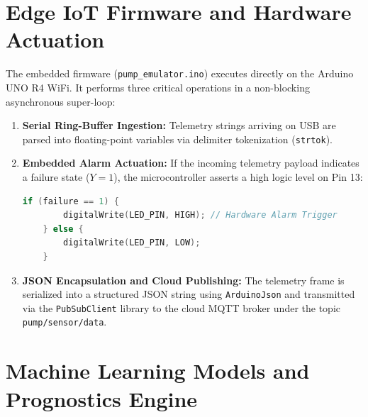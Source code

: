 \documentclass[11pt,a4paper]{article}
\begin{document}
\section{Edge IoT Firmware and Hardware Actuation}

The embedded firmware (\texttt{pump\_emulator.ino}) executes directly on the Arduino UNO R4 WiFi. It performs three critical operations in a non-blocking asynchronous super-loop:
\begin{enumerate}
    \item \textbf{Serial Ring-Buffer Ingestion:} Telemetry strings arriving on USB are parsed into floating-point variables via delimiter tokenization (\texttt{strtok}).
    \item \textbf{Embedded Alarm Actuation:} If the incoming telemetry payload indicates a failure state ($Y = 1$), the microcontroller asserts a high logic level on Pin 13:
    \begin{lstlisting}[language=C++]
    if (failure == 1) {
        digitalWrite(LED_PIN, HIGH); // Hardware Alarm Trigger
    } else {
        digitalWrite(LED_PIN, LOW);
    }
    \end{lstlisting}
    \item \textbf{JSON Encapsulation and Cloud Publishing:} The telemetry frame is serialized into a structured JSON string using \texttt{ArduinoJson} and transmitted via the \texttt{PubSubClient} library to the cloud MQTT broker under the topic \texttt{pump/sensor/data}.
\end{enumerate}

\section{Machine Learning Models and Prognostics Engine}
\end{document}
